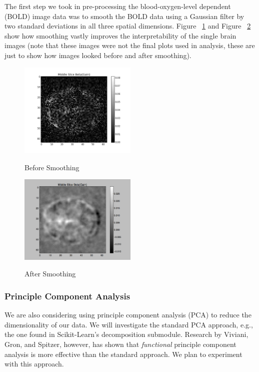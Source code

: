 \documentclass[11pt]{article}
\begin{document}
The first step we took in pre-processing the blood-oxygen-level dependent
(BOLD) image data was to smooth the BOLD data using a Gaussian filter by two
standard deviations in all three spatial dimensions. Figure
~\ref{fig:smoothing-before} and Figure ~\ref{fig:smoothing-after} show how
smoothing vastly improves the interpretability of the single brain images (note
that these images were not the final plots used in analysis, these are just to
show how images looked before and after smoothing).

\begin{figure}[h]
\caption{Before Smoothing}
\centering
\includegraphics[width=0.5\textwidth]{smoothing-before.png}
\label{fig:smoothing-before}
\end{figure}

\begin{figure}[h]
\caption{After Smoothing}
\centering
\includegraphics[width=0.5\textwidth]{smoothing-after.png}
\label{fig:smoothing-after}
\end{figure}

\subsubsection{Principle Component Analysis}

We are also considering using principle component analysis (PCA) to reduce the
dimensionality of our data. We will investigate the standard PCA approach,
e.g., the one found in Scikit-Learn's decomposition submodule. Research by
Viviani, Gron, and Spitzer\cite{viviani}, however, has shown that
\textit{functional} principle component analysis is more effective than the
standard approach. We plan to experiment with this approach.
\end{document}
